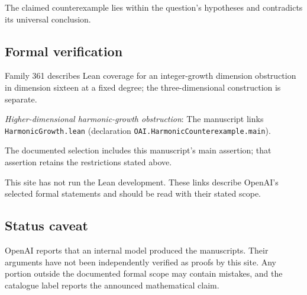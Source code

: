 \documentclass[11pt]{article}
\begin{document}
The claimed counterexample lies within the question’s hypotheses and contradicts its universal conclusion.

\subsection{Formal verification}
Family 361 describes Lean coverage for an integer-growth dimension obstruction in dimension sixteen at a fixed degree; the three-dimensional construction is separate.

\textit{Higher-dimensional harmonic-growth obstruction}: The manuscript links \texttt{HarmonicGrowth.lean} (declaration \texttt{OAI.HarmonicCounterexample.main}).

The documented selection includes this manuscript’s main assertion; that assertion retains the restrictions stated above.

This site has not run the Lean development. These links describe OpenAI’s selected formal statements and should be read with their stated scope.

\subsection{Status caveat}
OpenAI reports that an internal model produced the manuscripts. Their arguments have not been independently verified as proofs by this site. Any portion outside the documented formal scope may contain mistakes, and the catalogue label reports the announced mathematical claim.
\end{document}
